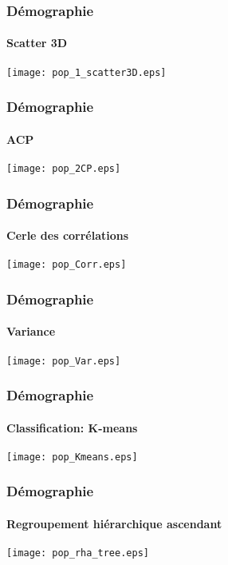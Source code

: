 \documentclass{beamer}
\begin{document}
\begin{frame}
	\frametitle{Démographie}
	\framesubtitle{Scatter 3D}
	\begin{center}
	\texttt{[image: pop\_1\_scatter3D.eps]}
	\end{center}
\end{frame}


\begin{frame}
	\frametitle{Démographie}
	\framesubtitle{ACP}
	\begin{center}
	\texttt{[image: pop\_2CP.eps]}
	\end{center}
\end{frame}


\begin{frame}
	\frametitle{Démographie}
	\framesubtitle{Cerle des corrélations}
	\begin{center}
	\texttt{[image: pop\_Corr.eps]}
	\end{center}
\end{frame}


\begin{frame}
	\frametitle{Démographie}
	\framesubtitle{Variance}
	\begin{center}
	\texttt{[image: pop\_Var.eps]}
	\end{center}
\end{frame}


\begin{frame}
	\frametitle{Démographie}
	\framesubtitle{Classification: K-means}
	\begin{center}
	\texttt{[image: pop\_Kmeans.eps]}
	\end{center}
\end{frame}


\begin{frame}
	\frametitle{Démographie}
	\framesubtitle{Regroupement hiérarchique ascendant}
	\begin{center}
	\texttt{[image: pop\_rha\_tree.eps]}
	\end{center}
\end{frame}
\end{document}
